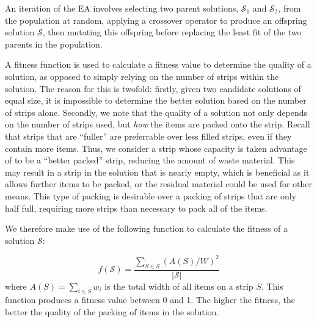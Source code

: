 \documentclass{elsarticle}
\begin{document}
An iteration of the EA involves selecting two parent solutions, $\mathcal{S}_1$ and $\mathcal{S}_2$, from the population at random, applying a crossover operator to produce an offspring solution $\mathcal{S}$, then mutating this offspring before replacing the least fit of the two parents in the population.

A fitness function is used to calculate a fitness value to determine the quality of a solution, as opposed to simply relying on the number of strips within the solution. The reason for this is twofold: firstly, given two candidate solutions of equal size, it is impossible to determine the better solution based on the number of strips alone. Secondly, we note that the quality of a solution not only depends on the number of strips used, but \emph{how} the items are packed onto the strip. Recall that strips that are ``fuller'' are preferrable over less filled strips, even if they contain more items. Thus, we consider a strip whose capacity is taken advantage of to be a ``better packed'' strip, reducing the amount of waste material. This may result in a strip in the solution that is nearly empty, which is beneficial as it allows further items to be packed, or the residual material could be used for other means. This type of packing is desirable over a packing of strips that are only half full, requiring more strips than necessary to pack all of the items. 

We therefore make use of the following function to calculate the fitness of a solution $\mathcal{S}$:

\begin{equation}
	f(\mathcal{S}) = \frac{\sum_{S \in \mathcal{S}} (A(S)/W)^2}{|\mathcal{S}|}
\end{equation}
\noindent where $A(S) = \sum_{i \in S} w_i$ is the total width of all items on a strip $S$. This function produces a fitness value between 0 and 1. The higher the fitness, the better the quality of the packing of items in the solution.
\end{document}
